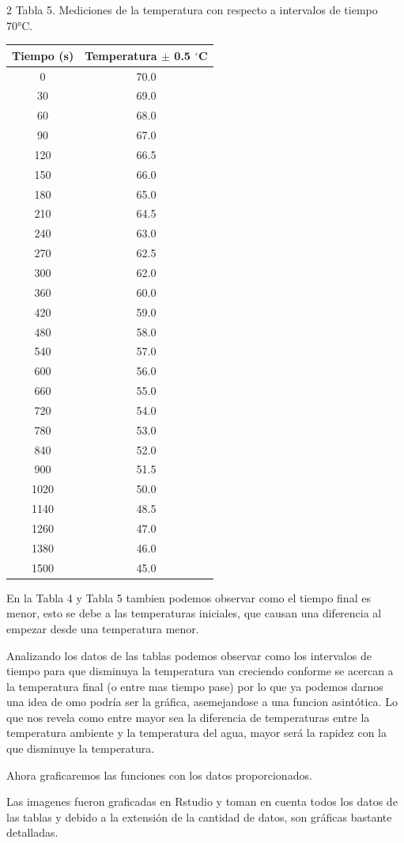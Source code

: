 \documentclass[11pt,letterpaper]{article}
\begin{document}
\begin{multicols}{2}
Tabla 5. Mediciones de la temperatura con respecto a intervalos de tiempo 70°C.

\begin{tabular}{|c|c|}
	\hline
	\textbf{Tiempo (s)} & \textbf{Temperatura  $\pm$ 0.5 $^\circ$C}  \\ \hline
	0    & 70.0  \\ \hline
	30   & 69.0  \\ \hline
	60   & 68.0  \\ \hline
	90   & 67.0  \\ \hline
	120  & 66.5  \\ \hline
	150  & 66.0  \\ \hline
	180  & 65.0  \\ \hline
	210  & 64.5  \\ \hline
	240  & 63.0  \\ \hline
	270  & 62.5  \\ \hline
	300  & 62.0  \\ \hline
	360  & 60.0  \\ \hline
	420  & 59.0  \\ \hline
	480  & 58.0  \\ \hline
	540  & 57.0  \\ \hline
	600  & 56.0  \\ \hline
	660  & 55.0  \\ \hline
	720  & 54.0  \\ \hline
	780  & 53.0  \\ \hline
	840  & 52.0  \\ \hline
	900  & 51.5  \\ \hline
	1020 & 50.0  \\ \hline
	1140 & 48.5  \\ \hline
	1260 & 47.0  \\ \hline
	1380 & 46.0  \\ \hline
	1500 & 45.0  \\ \hline
\end{tabular}


En la Tabla 4 y Tabla 5 tambien podemos observar como el tiempo final es menor, esto se debe a las temperaturas iniciales, que causan una diferencia al empezar desde una temperatura menor.

Analizando los datos de las tablas podemos observar como los intervalos de tiempo para que disminuya la temperatura van creciendo conforme se acercan a la temperatura final (o entre mas tiempo pase) por lo que ya podemos darnos una idea de omo podría ser la gráfica, asemejandose a una funcion asintótica. Lo que nos revela como entre mayor sea la diferencia de temperaturas entre la temperatura ambiente y la temperatura del agua, mayor será la rapidez con la que disminuye la temperatura.

Ahora graficaremos las funciones con los datos proporcionados.

Las imagenes fueron graficadas en Rstudio y toman en cuenta todos los datos de las tablas y debido a la extensión de la cantidad de datos, son gráficas bastante detalladas.
\end{multicols}
\end{document}
